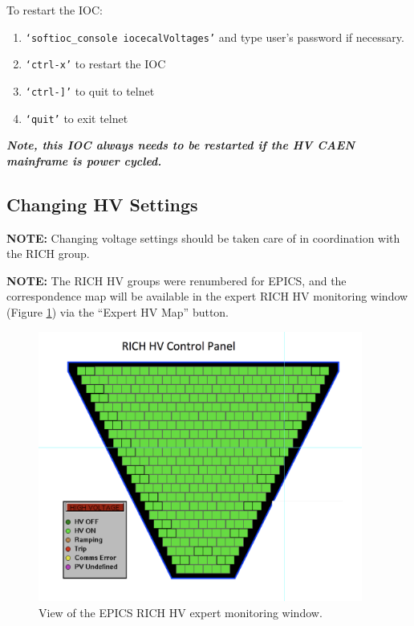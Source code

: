 \documentclass[12pt]{article}
\begin{document}
   To restart the IOC:
   {\footnotesize
   \begin{enumerate}
       \item \texttt{`softioc\_console iocecalVoltages'} and type user's password if necessary.
       \item \texttt{`ctrl-x'} to restart the IOC
       \item \texttt{`ctrl-]'} to quit to telnet
       \item \texttt{`quit'} to exit telnet
   \end{enumerate}
   }

{\bf\em Note, this IOC always needs to be restarted if the HV CAEN mainframe is power cycled.}
   
   \subsection{Changing HV Settings}
      {\bf NOTE:} Changing voltage settings should be taken care of in coordination with the RICH group. 

 {\bf NOTE:} The RICH HV groups were renumbered for EPICS, and the correspondence map 
 will be available in the expert RICH HV monitoring window (Figure 
 \ref{HV}) via the ``Expert HV Map'' button.

\begin{figure}[htbp]
\center
\includegraphics[width=0.95\textwidth]{pics/RICH_HV_control.png}
\caption{ \label{HV} View of the EPICS RICH HV expert monitoring window.}
\end{figure}
\end{document}
